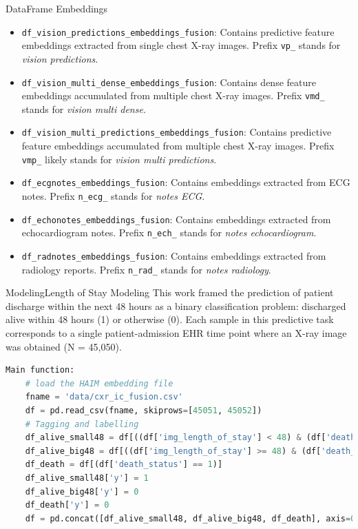 \documentclass{sintefbeamer}
\theoremstyle{definition}
\begin{document}
\begin{frame}{DataFrame Embeddings}
\footnotesize

\begin{itemize}

  
  \item \texttt{df\_vision\_predictions\_embeddings\_fusion}: Contains predictive feature embeddings extracted from single chest X-ray images. Prefix \texttt{vp\_}  stands for \emph{vision predictions}.
  
  \item \texttt{df\_vision\_multi\_dense\_embeddings\_fusion}: Contains dense feature embeddings accumulated from multiple chest X-ray images. Prefix \texttt{vmd\_}  stands for \emph{vision multi dense}.
  
  \item \texttt{df\_vision\_multi\_predictions\_embeddings\_fusion}: Contains predictive feature embeddings accumulated from multiple chest X-ray images. Prefix \texttt{vmp\_} likely stands for \emph{vision multi predictions}.
  
  \item \texttt{df\_ecgnotes\_embeddings\_fusion}: Contains embeddings extracted from ECG notes. Prefix \texttt{n\_ecg\_} stands for \emph{notes ECG}.
  
  \item \texttt{df\_echonotes\_embeddings\_fusion}: Contains embeddings extracted from echocardiogram notes. Prefix \texttt{n\_ech\_}  stands for \emph{notes echocardiogram}.
  
  \item \texttt{df\_radnotes\_embeddings\_fusion}: Contains embeddings extracted from radiology reports. Prefix \texttt{n\_rad\_} stands for \emph{notes radiology}.
\end{itemize}

\end{frame}

\begin{frame}[fragile]{Modeling}{Length of Stay Modeling}
\small
This work framed the prediction of patient discharge within the next 48 hours as a binary classification problem: discharged alive within 48 hours (1) or otherwise (0). Each sample in this predictive task corresponds to a single patient-admission EHR time point where an X-ray image was obtained (N = 45,050).
\begin{lstlisting}[language=Python]
Main function:
    # load the HAIM embedding file
    fname = 'data/cxr_ic_fusion.csv'
    df = pd.read_csv(fname, skiprows=[45051, 45052])    
    # Tagging and labelling
    df_alive_small48 = df[((df['img_length_of_stay'] < 48) & (df['death_status'] == 0))]
    df_alive_big48 = df[((df['img_length_of_stay'] >= 48) & (df['death_status'] == 0))]
    df_death = df[(df['death_status'] == 1)]
    df_alive_small48['y'] = 1
    df_alive_big48['y'] = 0
    df_death['y'] = 0 
    df = pd.concat([df_alive_small48, df_alive_big48, df_death], axis=0)
\end{lstlisting}
\end{frame}
\end{document}
